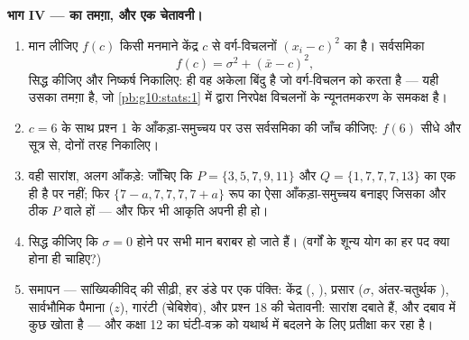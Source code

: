 \begin{problem}
\medskip
\noindent\textbf{भाग IV ---  का तमग़ा, और एक चेतावनी।}
\begin{enumerate}[resume]
  \item मान लीजिए $f(c)$ किसी मनमाने केंद्र $c$ से वर्ग-विचलनों $(x_i - c)^2$ का
         है। सर्वसमिका
        \[
        f(c) = \sigma^2 + (\bar x - c)^2 ,
        \]
        सिद्ध कीजिए और निष्कर्ष निकालिए:  ही वह अकेला बिंदु है जो
         वर्ग-विचलन को  करता है --- यही उसका तमग़ा है, जो \cref{pb:g10:stats:1}
        में  द्वारा निरपेक्ष विचलनों के न्यूनतमकरण के समकक्ष है।
  \item $c = 6$ के साथ प्रश्न 1 के आँकड़ा-समुच्चय पर उस सर्वसमिका की जाँच
        कीजिए: $f(6)$ सीधे और सूत्र से, दोनों तरह निकालिए।
  \item वही सारांश, अलग आँकड़े: जाँचिए कि $P = \{3, 5, 7, 9, 11\}$ और $Q = \{1, 7, 7, 7, 13\}$ का  एक ही है
        पर  नहीं; फिर $\{7 - a, 7, 7, 7, 7 + a\}$ रूप का ऐसा आँकड़ा-समुच्चय बनाइए जिसका
         और  ठीक $P$ वाले हों --- और फिर भी आकृति अपनी ही हो।
  \item सिद्ध कीजिए कि $\sigma = 0$ होने पर सभी मान बराबर हो जाते हैं। (वर्गों के
        शून्य योग का हर पद क्या होना ही चाहिए?)
  \item समापन --- सांख्यिकीविद् की सीढ़ी, हर डंडे पर एक पंक्ति: केंद्र
        (, ), प्रसार ($\sigma$, अंतर-चतुर्थक ), सार्वभौमिक
        पैमाना ($z$), गारंटी (चेबिशेव), और प्रश्न 18 की चेतावनी: सारांश
        दबाते हैं, और दबाव में कुछ खोता है --- और कक्षा 12 का घंटी-वक्र
         को यथार्थ  में बदलने के लिए प्रतीक्षा कर रहा है।
\end{enumerate}
\end{problem}
